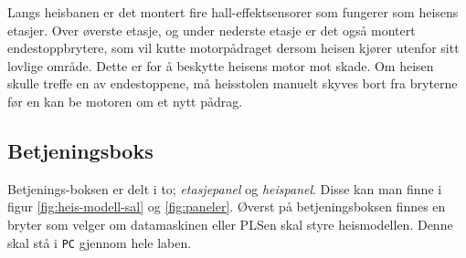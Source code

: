 \begin{alphasection}
Langs heisbanen er det montert fire hall-effektsensorer som fungerer som heisens etasjer. Over øverste etasje, og under nederste etasje er det også montert endestoppbrytere, som vil kutte motorpådraget dersom heisen kjører utenfor sitt lovlige område. Dette er for å beskytte heisens motor mot skade. Om heisen skulle treffe en av endestoppene, må heisstolen manuelt skyves bort fra bryterne før en kan be motoren om et nytt pådrag.

\subsection{Betjeningsboks}
Betjenings-boksen er delt i to; \textit{etasjepanel} og \textit{heispanel}. Disse kan man finne i figur \ref{fig:heis-modell-sal} og \ref{fig:paneler}. Øverst på betjeningsboksen finnes en bryter som velger om datamaskinen eller PLSen skal styre heismodellen. Denne skal stå i \verb|PC| gjennom hele laben.

\begin{figure}[ht]
    \centering
    




\begin{tikzpicture}[x=0.75pt,y=0.75pt,yscale=-1,xscale=1]


\end{tikzpicture}
\end{figure}
\end{alphasection}

